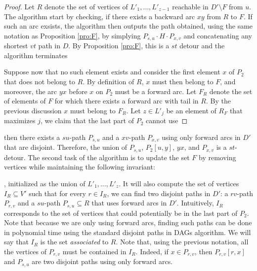 \documentclass[utf8,11pt]{article}
\theoremstyle{plain}
\theoremstyle{definition}
\begin{document}
\begin{proof}
    Let $R$ denote the set of vertices of $L'_1, \dots, L'_{z-1}$ reachable in $D' \setminus F$ from $u$. The algorithm start by checking, if there exists a backward arc $xy$ from $R$ to $F$. If such an arc exsists, the algorithm then outputs the path obtained, using the same notation as Proposition \ref{pro:F}, by simplying $P_{s,u} \cdot H \cdot P_{x,v}$ and concatenating any shortest $vt$ path in $D$. By Proposition \ref{pro:F}, this is a $st$ detour and the algorithm terminates
    
    Suppose now that no such element exists and consider the first element $x$ of $P_2$ that does not belong to $R$. By definition of $R$, $x$ must then belong to $F$, and moreover, the arc $yx$ before $x$ on $P_2$ must be a forward arc. Let $F_R$ denote the set of elements of $F$ for which there exists a forward arc with tail in $R$. By the previous discussion $x$ must belong to $F_R$. Let $z \in L'_j$ be an element of $R_F$ that maximizes $j$, we claim that the last part of $P_2$ cannot use  
\end{proof}

then there exists a $su$-path $P_{s,u}$ and a $xv$-path $P_{x,v}$ using only forward arcs in $D'$ that are disjoint. Therefore, the union of $P_{s,u}$, $P_2[u,y]$, $yx$, and $P_{x,v}$ is a $st$-detour. The second task of the algorithm is to update the set $F$ by removing vertices while maintaining the following invariant:

, initialized as the union of $L'_1, \dots, L'_{z}$. It will also compute the set of vertices $I_{R} \subseteq V'$ such that for every $r \in I_R$, we can find two disjoint paths in $D'$: a $rv$-path $P_{r,v}$ and a $su$-path $P_{s,u} \subseteq R$ that uses forward arcs in $D'$. Intuitively, $I_R$ corresponds to the set of vertices that could potentially be in the last part of $P_2$. Note that because we are only using forward arcs, finding such paths can be done in polynomial time using the standard disjoint paths in DAGs algorithm. We will say that $I_R$ is the set \textit{associated} to $R$. Note that, using the previous notation, all the vertices of $P_{r,v}$ must be contained in $I_R$. Indeed, if $x \in P_{r,v}$, then $P_{r,v}[r,x]$ and $P_{s,u}$ are two disjoint paths using only forward arcs.
\end{document}
